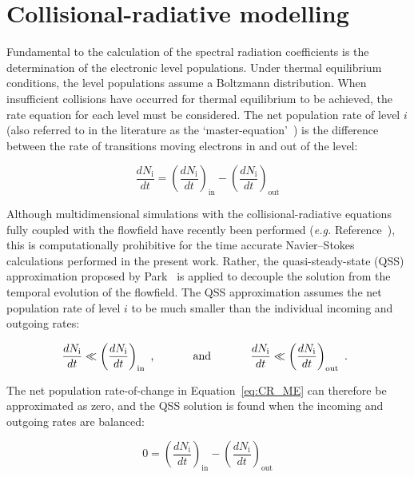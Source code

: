 \section{Collisional-radiative modelling}
\label{sec:CR}

Fundamental to the calculation of the spectral radiation coefficients is the determination of the electronic level populations.
Under thermal equilibrium conditions, the level populations assume a Boltzmann distribution.
When insufficient collisions have occurred for thermal equilibrium to be achieved, the rate equation for each level must be considered.
The net population rate of level $i$ (also referred to in the literature as the `master-equation'~\cite{park_1990}) is the difference between the rate of transitions moving electrons in and out of the level:

\begin{equation}
 \frac{dN_\text{i}}{dt} = \left ( \frac{dN_\text{i}}{dt} \right )_\text{in} - \left ( \frac{dN_\text{i}}{dt} \right )_\text{out} \label{eq:CR_ME}
\end{equation}

Although multidimensional simulations with the collisional-radiative equations fully coupled with the flowfield have recently been performed (\textit{e.g.} Reference~\cite{panesi_phd}), this is computationally prohibitive for the time accurate Navier--Stokes calculations performed in the present work.
Rather, the quasi-steady-state (QSS) approximation proposed by Park~\cite{park_1990} is applied to decouple the solution from the temporal evolution of the flowfield.
The QSS approximation assumes the net population rate of level $i$ to be much smaller than the individual incoming and outgoing rates:

\begin{equation}
 \frac{dN_\text{i}}{dt} \ll \left ( \frac{dN_\text{i}}{dt} \right )_\text{in} \text{ , \hspace{1cm} and \hspace{1cm} }  \frac{dN_\text{i}}{dt} \ll \left ( \frac{dN_\text{i}}{dt} \right )_\text{out} \text{ . }\nonumber
\end{equation}

The net population rate-of-change in Equation~\ref{eq:CR_ME} can therefore be approximated as zero, and the QSS solution is found when the incoming and outgoing rates are balanced:

\begin{equation}
 0 = \left ( \frac{dN_\text{i}}{dt} \right )_\text{in} - \left ( \frac{dN_\text{i}}{dt} \right )_\text{out} \label{eq:QSS_condition}
\end{equation}


